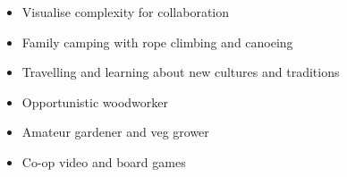\documentclass[10pt,a4paper,ragged2e,withhyper]{altacv}
\begin{document}
\begin{paracol}{2}
\begin{itemize}
    \item Visualise complexity for collaboration
\end{itemize}




\divider



\begin{itemize}
    \item Family camping with rope climbing and canoeing
    
    \item Travelling and learning about new cultures and traditions

    \item Opportunistic woodworker

    \item Amateur gardener and veg grower

    \item Co-op video and board games
\end{itemize}


\end{paracol}

\end{document}
